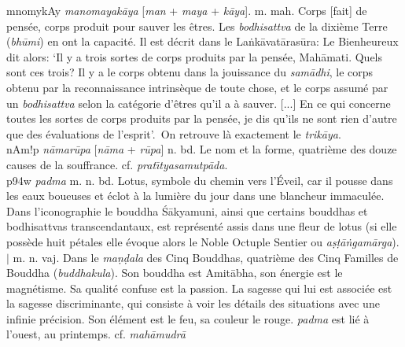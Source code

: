 \documentclass[a4paper,11pt,twocolumn]{article}
\begin{document}
{\dn mnomykAy} {\em manomayak\={a}ya} [{\em man} + {\em maya} +
{\em k\={a}ya}]. m. mah. \og Corps [fait] de pensée\fg, corps
produit pour sauver les êtres. Les {\em bodhisattva} de la dixième
Terre ({\em bh\={u}mi}) en ont la capacité. Il est décrit dans le
La\.{n}k\={a}vat\={a}ras\={u}ra: \og Le Bienheureux dit alors: `Il y a
trois sortes de corps produits par la pensée, Mah\={a}mati. Quels sont
ces trois? Il y a le corps obtenu dans la jouissance du {\em
sam\={a}dhi}, le corps obtenu par la reconnaissance intrinsèque de
toute chose, et le corps assumé par un {\em bodhisattva} selon la
catégorie d'êtres qu'il a à sauver. [...] En ce qui concerne toutes
les sortes de corps produits par la pensée, je dis qu'ils ne sont rien
d'autre que des évaluations de l'esprit'.\fg \ On retrouve là exactement
le {\em trik\={a}ya}. \\

{\dn nAm!p} {\em n\={a}mar\={u}pa} [{\em n\={a}ma} + {\em
r\={u}pa}] n. bd. \og Le nom et la forme\fg, quatrième des douze causes
de la souffrance. cf. {\em prat\={\i}tyasamutp\={a}da}. \\



{\dn p\394w} {\em padma} m. n. bd. \og Lotus\fg, symbole
du chemin vers l'Éveil, car il pousse dans les eaux boueuses et éclot
à la lumière du jour dans une blancheur immaculée. Dans
l'iconographie le bouddha \'{S}\={a}kyamuni, ainsi que certains
bouddhas et bodhisattvas transcendantaux, est représenté assis dans
une fleur de lotus (si elle possède huit pétales elle évoque alors le
Noble Octuple Sentier ou {\em a\d{s}\d{t}\={a}\.{n}gam\={a}rga}). $\mid$
m. n. vaj. Dans le {\em ma\d{n}\d{d}ala} des Cinq Bouddhas, quatrième
des Cinq Familles de Bouddha ({\em buddhakula}). Son bouddha est Amit\={a}bha,
son énergie est le magnétisme. Sa qualité confuse est la passion. La
sagesse qui lui est associée est \og la sagesse discriminante\fg, qui
consiste à  voir les détails des situations avec une infinie
précision. Son élément est le feu, sa couleur le rouge. {\em padma}
est lié à l'ouest, au printemps. cf. {\em mah\={a}mudr\={a}} \\
\end{document}
